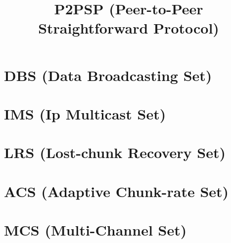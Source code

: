 \newcommand{\note}[1]{\color{red}\textbf{#1}}

\title{P2PSP (Peer-to-Peer Straightforward Protocol)}
\maketitle
\tableofcontents

\begin{abstract}

\end{abstract}

\section{DBS (Data Broadcasting Set)}
\label{sec:DBL}


\section{IMS (Ip Multicast Set)}
\label{sec:IMS}


\section{LRS (Lost-chunk Recovery Set)}
\label{sec:LRS}


\section{ACS (Adaptive Chunk-rate Set)}
\label{sec:ACS}


\section{MCS (Multi-Channel Set)}
\label{sec:MCS}



